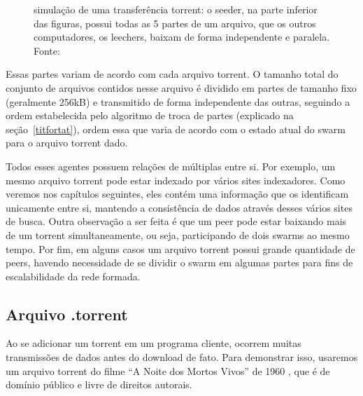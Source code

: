 \begin{figure}[hp]
    \vspace{\myvsize}

    \begin{subfigure}[H]{\myhsize}
        \caption{}
        \label{fig:torrent-repr-9}
    \end{subfigure}

    \caption{simulação de uma transferência torrent: o \gls{seeder}, na parte
    inferior das figuras, possui todas as 5 partes de um arquivo, que os outros
    computadores, os \glspl{leecher}, baixam de forma independente e paralela. Fonte:
    \cite{fig:torrent-dl}}
    \label{fig:torrent-repr}
\end{figure}

Essas partes variam de acordo com cada arquivo \gls*{torrent}. O tamanho total do
conjunto de arquivos contidos nesse arquivo é dividido em partes de tamanho fixo
(geralmente 256kB) e transmitido de forma independente das outras, seguindo a ordem
estabelecida pelo algoritmo de troca de partes (explicado na seção~\ref{titfortat}),
ordem essa que varia de acordo com o estado atual do \gls*{swarm} para o arquivo
\gls*{torrent} dado.

Todos esses agentes possuem relações de múltiplas entre si. Por exemplo, um mesmo
arquivo \gls*{torrent} pode estar indexado por vários sites indexadores. Como veremos
nos capítulos seguintes, eles contém uma informação que os identificam unicamente entre
si, mantendo a consistência de dados através desses vários sites de busca. Outra
observação a ser feita é que um \gls*{peer} pode estar baixando mais de um
\gls*{torrent} simultaneamente, ou seja, participando de dois \glspl*{swarm} ao mesmo
tempo. Por fim, em alguns casos um arquivo \gls*{torrent} possui grande quantidade de
\glspl*{peer}, havendo necessidade de se dividir o \gls*{swarm} em algumas partes para
fins de escalabilidade da rede formada.

\newpage
\subsection*{Arquivo .torrent}

Ao se adicionar um \gls*{torrent} em um programa cliente, ocorrem muitas transmissões de
dados antes do download de fato. Para demonstrar isso, usaremos um arquivo torrent do
filme ``A Noite dos Mortos Vivos'' de 1960 \cite{torrent-file}, que é de domínio público
e livre de direitos autorais.


